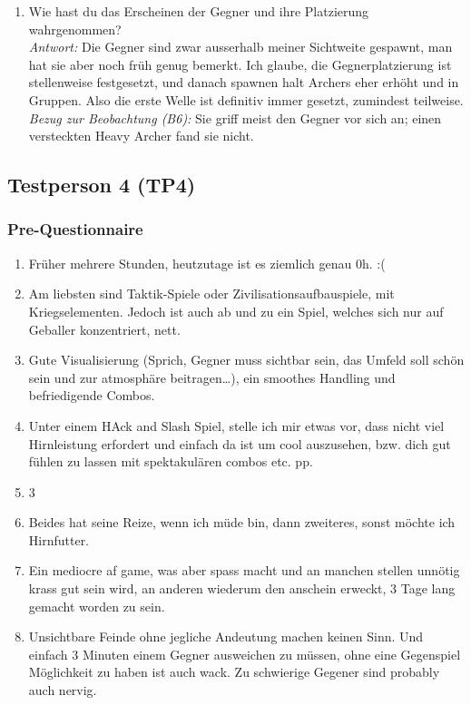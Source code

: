 \documentclass[../Main.tex]{subfiles}
\begin{document}
\begin{enumerate}[label=\textbf{I\arabic*}, leftmargin=1.5cm, itemsep=1em]
\item Wie hast du das Erscheinen der Gegner und ihre Platzierung wahrgenommen? \\
\textit{Antwort:} Die Gegner sind zwar ausserhalb meiner Sichtweite gespawnt, man hat sie aber noch früh genug bemerkt. Ich glaube, die Gegnerplatzierung ist stellenweise festgesetzt, und danach spawnen halt Archers eher erhöht und in Gruppen. Also die erste Welle ist definitiv immer gesetzt, zumindest teilweise. \\
\textit{Bezug zur Beobachtung (B6):} Sie griff meist den Gegner vor sich an; einen versteckten Heavy Archer fand sie nicht.
\end{enumerate}

\subsection{Testperson 4 (TP4)}

\subsubsection{Pre-Questionnaire}

\begin{enumerate}[label=\textbf{P\arabic*}, leftmargin=1.5cm, itemsep=0.5em]
\item Früher mehrere Stunden, heutzutage ist es ziemlich genau 0h. :(
\item Am liebsten sind Taktik-Spiele oder Zivilisationsaufbauspiele, mit Kriegselementen. Jedoch ist auch ab und zu ein Spiel, welches sich nur auf Geballer konzentriert, nett.
\item Gute Visualisierung (Sprich, Gegner muss sichtbar sein, das Umfeld soll schön sein und zur atmosphäre beitragen…), ein smoothes Handling und befriedigende Combos.
\item Unter einem HAck and Slash Spiel, stelle ich mir etwas vor, dass nicht viel Hirnleistung erfordert und einfach da ist um cool auszusehen, bzw. dich gut fühlen zu lassen mit spektakulären combos etc. pp.
\item 3
\item Beides hat seine Reize, wenn ich müde bin, dann zweiteres, sonst möchte ich Hirnfutter.
\item Ein mediocre af game, was aber spass macht und an manchen stellen unnötig krass gut sein wird, an anderen wiederum den anschein erweckt, 3 Tage lang gemacht worden zu sein.
\item Unsichtbare Feinde ohne jegliche Andeutung machen keinen Sinn. Und einfach 3 Minuten einem Gegner ausweichen zu müssen, ohne eine Gegenspiel Möglichkeit zu haben ist auch wack. Zu schwierige Gegener sind probably auch nervig.
\end{enumerate}
\end{document}
